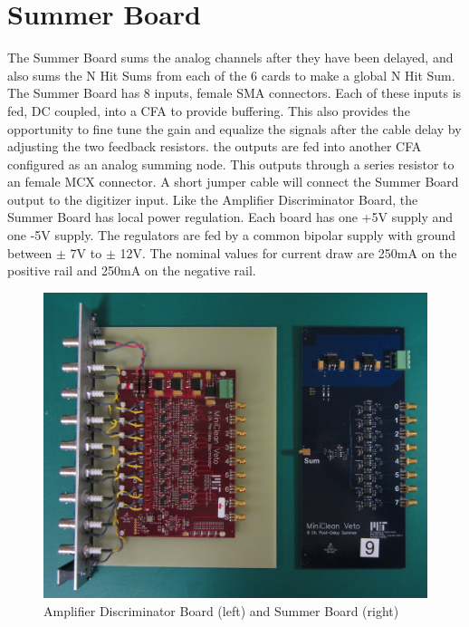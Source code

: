 \documentclass[preprint,12pt]{elsarticle}
\begin{document}
\section{Summer Board}
\label{Sum}
The Summer Board sums the analog channels after they have been delayed, and also sums the N Hit Sums from each of the 6 cards to make a global N Hit Sum.  The Summer Board has 8 inputs, female SMA connectors.  Each of these inputs is fed, DC coupled, into a CFA to provide buffering.  This also provides the opportunity to fine tune the gain and equalize the signals after the cable delay by adjusting the two feedback resistors.  the outputs are fed into another CFA configured as an analog summing node.  This outputs through a series resistor to an female MCX connector.  A short jumper cable will connect the Summer Board output to the digitizer input.
Like the Amplifier Discriminator Board, the Summer Board has local power regulation.  Each board has one +5V supply and one -5V supply.  The regulators are fed by a common bipolar supply with ground between $\pm$ 7V to $\pm$ 12V.  The nominal values for current draw are 250mA on the positive rail and 250mA on the negative rail.

\begin{figure}[h]
\begin{center}
\includegraphics[width=5in, keepaspectratio=true]{graphics/boards}
\caption{Amplifier Discriminator Board (left) and Summer Board (right)}
\label{fig:boards}
\end{center}
\end{figure}
\end{document}
